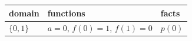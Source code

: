 \documentclass[border=5pt]{standalone}
\begin{document}
\begin{tabular}{lll}
domain & functions & facts \\
\hline
$\{0, 1\}$ & $a = 0$, $f(0) = 1$, $f(1) = 0$ & $p(0)$ \\
\end{tabular}
\end{document}
